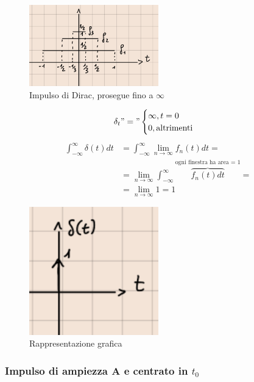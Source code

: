 \documentclass[a4paper, 12pt]{book}
\theoremstyle{plain}
\begin{document}
\begin{figure}
    \includegraphics[width=0.5\textwidth]{dirac.png}
    \caption{Impulso di Dirac, prosegue fino a $\infty$}
\end{figure}

\[
    \delta_t "=" \begin{cases}
        \infty, t = 0\\
        0, \textrm{altrimenti}
    \end{cases}
\]
\[
    \begin{split}
        \int_{-\infty}^\infty \delta(t) dt &= \int_{-\infty}^\infty \lim_{n \rightarrow \infty} f_n(t) dt = \\
        &= \lim_{n \rightarrow \infty} \int_{-\infty}^\infty \overbrace{f_n (t) dt}^{\textrm{ogni finestra ha area = 1}} = \\
        &= \lim_{n \rightarrow \infty} 1 = 1
    \end{split}
\]

\begin{figure}
    \includegraphics[width=0.5\textwidth]{frecciasu.png}
    \caption{Rappresentazione grafica}
\end{figure}

\subsubsection{Impulso di ampiezza A e centrato in $t_0$}
\end{document}
